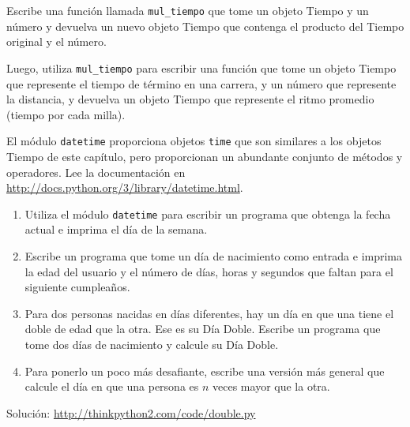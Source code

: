\documentclass[10pt]{book}
\begin{document}
\begin{exercise}

Escribe una función llamada \verb"mul_tiempo" que tome un objeto Tiempo
y un número y devuelva un nuevo objeto Tiempo que contenga
el producto del Tiempo original y el número.

Luego, utiliza \verb"mul_tiempo" para escribir una función que tome un objeto
Tiempo que represente el tiempo de término en una carrera, y un número
que represente la distancia, y devuelva un objeto Tiempo que represente
el ritmo promedio (tiempo por cada milla).

\end{exercise}


\begin{exercise}

El módulo {\tt datetime} proporciona objetos {\tt time}
que son similares a los objetos Tiempo de este capítulo, pero
proporcionan un abundante conjunto de métodos y operadores.  Lee la
documentación en \url{http://docs.python.org/3/library/datetime.html}.

\begin{enumerate}

\item Utiliza el módulo {\tt datetime} para escribir un programa que obtenga la
  fecha actual e imprima el día de la semana.

\item Escribe un programa que tome un día de nacimiento como entrada e imprima la
  edad del usuario y el número de días, horas y segundos que faltan para
  el siguiente cumpleaños.

\item Para dos personas nacidas en días diferentes, hay un día en que una
  tiene el doble de edad que la otra.  Ese es su Día Doble.  Escribe un
  programa que tome dos días de nacimiento y calcule su Día Doble.

\item Para ponerlo un poco más desafiante, escribe una versión más general que
  calcule el día en que una persona es $n$ veces mayor que la otra.

\end{enumerate}

Solución: \url{http://thinkpython2.com/code/double.py}

\end{exercise}
\end{document}
